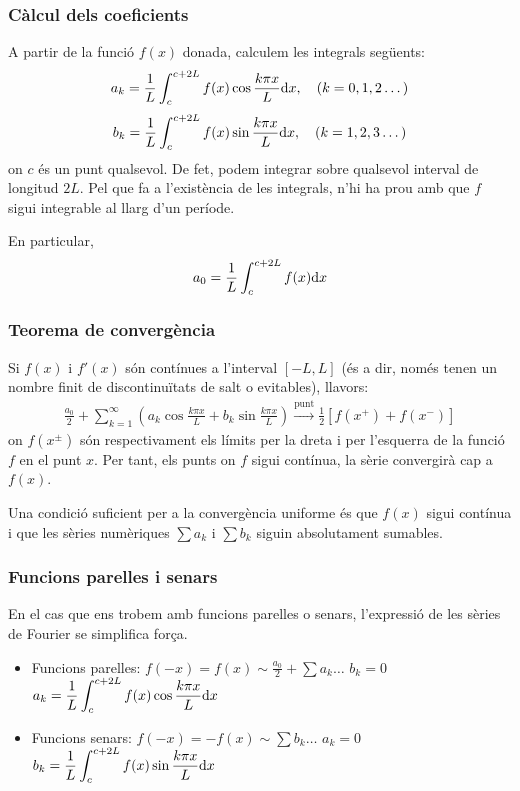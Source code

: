 \subsubsection*{Càlcul dels coeficients}
A partir de la funció $f(x)$ donada, calculem les integrals següents:
\begin{align}
    a_{k} = \frac{1}{L} \int_{c}^{c+2L} f(x) \cos \frac{k \pi x}{L} \mathrm{d} x , \quad (k = 0, 1, 2 \dots)
\end{align}
\begin{align}
    b_{k} = \frac{1}{L} \int_{c}^{c+2L} f(x) \sin \frac{k \pi x}{L} \mathrm{d} x , \quad (k = 1, 2, 3 \dots)
\end{align}
on $c$ és un punt qualsevol. De fet, podem integrar sobre qualsevol interval de longitud $2L$. Pel que fa a l'existència de les integrals, n'hi ha prou amb que $f$ sigui integrable al llarg d'un període.

En particular, 
\begin{align}
    a_{0} = \frac{1}{L} \int_{c}^{c+2L} f(x) \mathrm{d} x
\end{align}

\subsubsection*{Teorema de convergència}
Si $f(x)$ i $f'(x)$ són contínues a l'interval $[-L, L]$ (és a dir, només tenen un nombre finit de discontinuïtats de salt o evitables), llavors:
\begin{align}
    \frac{a_{0}}{2} + \sum\limits_{k=1}^{\infty} \left( a_{k} \cos \frac{k \pi x}{L} + b_{k} \sin \frac{k \pi x}{L} \right) \overset{\text{punt}}{\longrightarrow} \frac{1}{2} \left[ f(x^{+}) + f(x^{-}) \right]
\end{align}
on $f(x^{\pm})$ són respectivament els límits per la dreta i per l'esquerra de la funció $f$ en el punt $x$. Per tant, els punts on $f$ sigui contínua, la sèrie convergirà cap a $f(x)$.

Una condició suficient per a la convergència uniforme és que $f(x)$ sigui contínua i que les sèries numèriques $\sum a_{k}$ i $\sum b_{k}$ siguin absolutament sumables.

\subsubsection*{Funcions parelles i senars}
En el cas que ens trobem amb funcions parelles o senars, l'expressió de les sèries de Fourier se simplifica força.
\begin{itemize}
    \item Funcions parelles: $f(-x) = f(x) \sim \frac{a_{0}}{2} + \sum a_{k} \dots$
        \subitem $\displaystyle b_{k} = 0 $
        \subitem $\displaystyle a_{k} = \frac{1}{L} \int_{c}^{c+2L} f(x) \cos \frac{k \pi x}{L} \mathrm{d} x $
    \item Funcions senars: $f(-x) = -f(x) \sim \sum b_{k} \dots$
        \subitem $\displaystyle a_{k} = 0$
        \subitem $\displaystyle b_{k} = \frac{1}{L} \int_{c}^{c+2L} f(x) \sin \frac{k \pi x}{L} \mathrm{d} x $
\end{itemize}